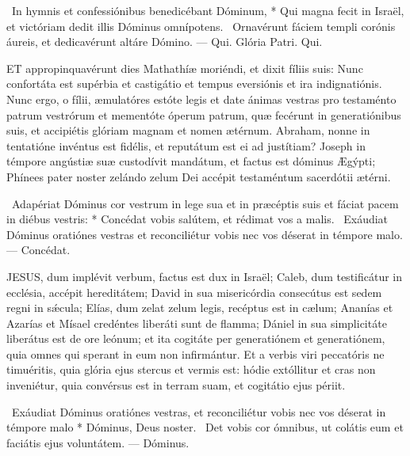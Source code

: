 \R\ In hymnis et confessiónibus benedicébant Dóminum, * Qui magna fecit in Israël, et victóriam dedit illis Dóminus omnípotens. \V\ Ornavérunt fáciem templi corónis áureis, et dedicavérunt altáre Dómino. — Qui. Glória Patri. Qui.




\lettrine[lines=2]{E}{T} appropinquavérunt dies Mathathíæ moriéndi, et dixit fíliis suis: Nunc confortáta est supérbia et castigátio et tempus eversiónis et ira indignatiónis. Nunc ergo, o fílii, æmulatóres estóte legis et date ánimas vestras pro testaménto patrum vestrórum et mementóte óperum patrum, quæ fecérunt in generatiónibus suis, et accipiétis glóriam magnam et nomen ætérnum. Abraham, nonne in tentatióne invéntus est fidélis, et reputátum est ei ad justítiam? Joseph in témpore angústiæ suæ custodívit mandátum, et factus est dóminus Ægýpti; Phínees pater noster zelándo zelum Dei accépit testaméntum sacerdótii ætérni.

\R\ Adapériat Dóminus cor vestrum in lege sua et in præcéptis suis et fáciat pacem in diébus vestris: * Concédat vobis salútem, et rédimat vos a malis. \V\ Exáudiat Dóminus oratiónes vestras et reconciliétur vobis nec vos déserat in témpore malo. — Concédat.


\lettrine[lines=2]{J}{ESUS}, dum implévit verbum, factus est dux in Israël; Caleb, dum testificátur in ecclésia, accépit hereditátem; David in sua misericórdia consecútus est sedem regni in sǽcula; Elías, dum zelat zelum legis, recéptus est in cælum; Ananías et Azarías et Mísael credéntes liberáti sunt de flamma; Dániel in sua simplicitáte liberátus est de ore leónum; et ita cogitáte per generatiónem et generatiónem, quia omnes qui sperant in eum non infirmántur. Et a verbis viri peccatóris ne timuéritis, quia glória ejus stercus et vermis est: hódie extóllitur et cras non inveniétur, quia convérsus est in terram suam, et cogitátio ejus périit.

\R\ Exáudiat Dóminus oratiónes vestras, et reconciliétur vobis nec vos déserat in témpore malo * Dóminus, Deus noster. \V\ Det vobis cor ómnibus, ut colátis eum et faciátis ejus voluntátem. — Dóminus.



